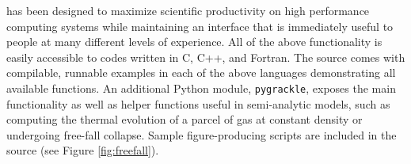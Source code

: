 \grackle{} has been designed to maximize scientific productivity on
high performance computing systems while maintaining an interface that
is immediately useful to people at many different levels of
experience.
All of the above functionality is easily accessible to codes written
in C, C++, and Fortran.  The source comes with compilable,
runnable examples in each of the above languages demonstrating all
available functions.  An additional Python module, \texttt{pygrackle},
exposes the main functionality as well as helper functions useful in
semi-analytic models, such as computing the
thermal evolution of a parcel of gas at constant density or undergoing
free-fall collapse.  Sample figure-producing scripts
are included in the source (see Figure \ref{fig:freefall}).



